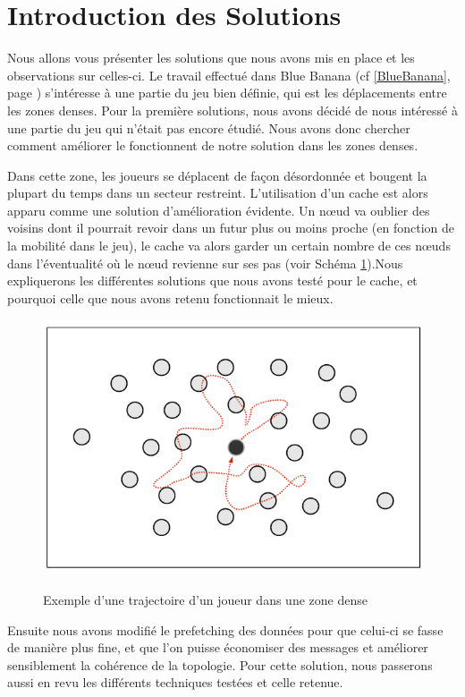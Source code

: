 \section{Introduction des Solutions}
\label{introSolutions}
	Nous allons vous présenter les solutions que nous avons mis en place et les observations sur celles-ci. Le travail effectué dans Blue Banana (cf \ref{BlueBanana}, page \pageref{BlueBanana}) s'intéresse à une partie du jeu bien définie, qui est les déplacements entre les zones denses. Pour la première solutions, nous avons décidé de nous intéressé à une partie du jeu qui n'était pas encore étudié. Nous avons donc chercher comment améliorer le fonctionnent de notre solution dans les zones denses. 
\par Dans cette zone, les joueurs se déplacent de façon désordonnée et bougent la plupart du temps dans un secteur restreint. L'utilisation d'un cache est alors apparu comme une solution d'amélioration évidente. Un nœud va oublier des voisins dont il pourrait revoir dans un futur plus ou moins proche (en fonction de la mobilité dans le jeu), le cache va alors garder un certain nombre de ces nœuds dans l'éventualité où le nœud revienne sur ses pas (voir Schéma \ref{mouveDense}).Nous expliquerons les différentes solutions que nous avons testé pour le cache, et pourquoi celle que nous avons retenu fonctionnait le mieux.
	\vspace{5mm}
        \begin{figure}[!h]
        \centering
        \includegraphics[scale=0.45]{./Ressources/Images/mouvementsZoneDense.png}\\
        \caption{Exemple d'une trajectoire d'un joueur dans une zone dense}
        \label{mouveDense}
        \end{figure}
\par Ensuite nous avons modifié le prefetching des données pour que celui-ci se fasse de manière plus fine, et que l'on puisse économiser des messages et améliorer sensiblement la cohérence de la topologie. Pour cette solution, nous passerons aussi en revu les différents techniques testées et celle retenue. 
